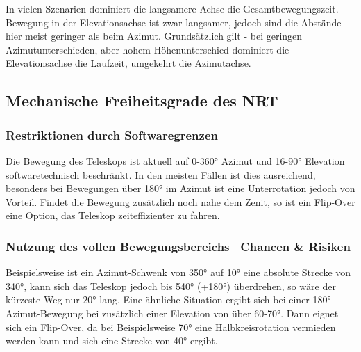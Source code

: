 In vielen Szenarien dominiert die langsamere Achse die Gesamtbewegungszeit. Bewegung in der Elevationsachse ist zwar langsamer, jedoch sind die Abstände hier meist geringer als beim Azimut.
Grundsätzlich gilt - bei geringen Azimutunterschieden, aber hohem Höhenunterschied dominiert die Elevationsachse die Laufzeit, umgekehrt die Azimutachse.

\subsection{Mechanische Freiheitsgrade des NRT}

\subsubsection{Restriktionen durch Softwaregrenzen}

Die Bewegung des Teleskops ist aktuell auf 0-360° Azimut und 16-90° Elevation softwaretechnisch beschränkt.
In den meisten Fällen ist dies ausreichend, besonders bei Bewegungen über 180° im Azimut ist eine Unterrotation jedoch von Vorteil. Findet die Bewegung zusätzlich noch nahe dem Zenit, so ist ein Flip-Over eine Option, das Teleskop zeiteffizienter zu fahren.

\subsubsection{Nutzung des vollen Bewegungsbereichs \textendash~Chancen \& Risiken}

Beispielsweise ist ein Azimut-Schwenk von 350° auf 10° eine absolute Strecke von 340°, kann sich das Teleskop jedoch bis 540° (+180°) überdrehen, so wäre der kürzeste Weg nur 20° lang.
Eine ähnliche Situation ergibt sich bei einer 180° Azimut-Bewegung bei zusätzlich einer Elevation von über 60-70°. Dann eignet sich ein Flip-Over, da bei Beispielsweise 70° eine Halbkreisrotation vermieden werden kann und sich eine Strecke von 40° ergibt.
